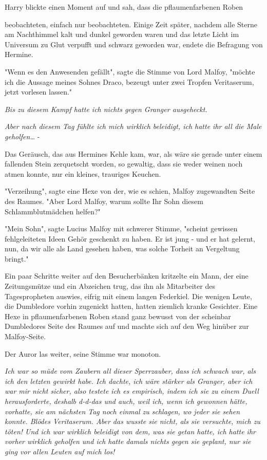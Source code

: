 {Harry blickte einen Moment auf und sah, dass die pflaumenfarbenen Roben

beobachteten, einfach nur beobachteten. Einige Zeit später, nachdem alle Sterne am Nachthimmel kalt und dunkel geworden waren und das letzte Licht im Universum zu Glut verpufft und schwarz geworden war, endete die Befragung von Hermine.

"Wenn es den Anwesenden gefällt", sagte die Stimme von Lord Malfoy, "möchte ich die Aussage meines Sohnes Draco, bezeugt unter zwei Tropfen Veritaserum, jetzt vorlesen lassen."

\emph{Bis zu diesem Kampf hatte ich nichts gegen Granger ausgeheckt.}

\emph{Aber nach diesem Tag fühlte ich mich wirklich beleidigt, ich hatte ihr all die Male geholfen…} -

Das Geräusch, das aus Hermines Kehle kam, war, als wäre sie gerade unter einem fallenden Stein zerquetscht worden, so gewaltig, dass sie weder weinen noch atmen konnte, nur ein kleines, trauriges Keuchen.

"Verzeihung", sagte eine Hexe von der, wie es schien, Malfoy zugewandten Seite des Raumes. "Aber Lord Malfoy, warum sollte Ihr Sohn diesem Schlammblutmädchen helfen?"

"Mein Sohn", sagte Lucius Malfoy mit schwerer Stimme, "scheint gewissen fehlgeleiteten Ideen Gehör geschenkt zu haben. Er ist jung - und er hat gelernt, nun, da wir alle als Land gesehen haben, was solche Torheit an Vergeltung bringt."

Ein paar Schritte weiter auf den Besucherbänken kritzelte ein Mann, der eine Zeitungsmütze und ein Abzeichen trug, das ihn als Mitarbeiter des Tagespropheten auswies, eifrig mit einem langen Federkiel. Die wenigen Leute, die Dumbledore vorhin zugenickt hatten, hatten ziemlich kranke Gesichter. Eine Hexe in pflaumenfarbenen Roben stand ganz bewusst von der scheinbar Dumbledores Seite des Raumes auf und machte sich auf den Weg hinüber zur Malfoy-Seite.

Der Auror las weiter, seine Stimme war monoton.

\emph{Ich war so müde vom Zaubern all dieser Sperrzauber, dass ich schwach war, als ich den letzten gewirkt habe. Ich dachte, ich wäre stärker als Granger, aber ich war mir nicht sicher, also testete ich es empirisch, indem ich sie zu einem Duell herausforderte,} \emph{deshalb d-d-das und auch, weil ich, wenn ich gewonnen hätte, vorhatte, sie am nächsten Tag noch einmal zu schlagen, wo jeder sie sehen konnte. Blödes Veritaserum. Aber das wusste sie nicht, als sie versuchte, mich zu töten! Und ich war wirklich beleidigt von dem, was sie getan hatte, ich hatte ihr vorher wirklich geholfen und ich hatte damals nichts gegen sie geplant, nur sie ging vor allen Leuten auf mich los!}

}

